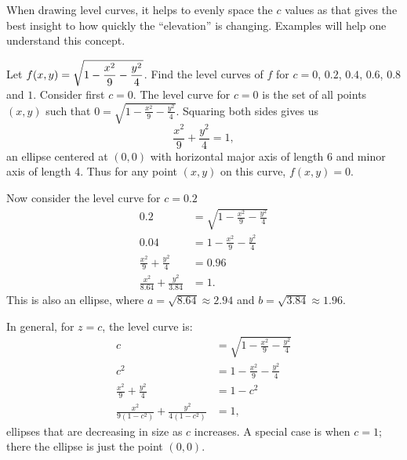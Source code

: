 When drawing level curves, it helps to evenly space the $c$ values as that gives the best insight to how quickly the ``elevation'' is changing. Examples will help one understand this concept.

\begin{example}\label{ex_levelcurve1}%
Let $\displaystyle f(x,y) = \sqrt{1-\frac{x^2}9-\frac{y^2}4}$. Find the level curves of $f$ for $c=0$, $0.2$, $0.4$, $0.6$, $0.8$ and $1$.
\solution
Consider first $c=0$. The level curve for $c=0$ is the set of all points $(x,y)$ such that $0=\sqrt{1-\frac{x^2}9-\frac{y^2}4}$. Squaring both sides  gives us
\[\frac{x^2}9+\frac{y^2}4=1,\]
an ellipse centered at $(0,0)$ with horizontal major axis of length 6 and minor axis of length 4. Thus for any point $(x,y)$ on this curve, $f(x,y) = 0$.

Now consider the level curve for $c=0.2$
\begin{align*}
0.2 &= \sqrt{1-\frac{x^2}9-\frac{y^2}4}\\
0.04 &= 1-\frac{x^2}9-\frac{y^2}4\\
\frac{x^2}9+\frac{y^2}4 &=0.96\\
\frac{x^2}{8.64}+\frac{y^2}{3.84} &=1.
\end{align*}
This is also an ellipse, where $a = \sqrt{8.64}\approx 2.94$ and $b=\sqrt{3.84}\approx 1.96$.

In general, for $z=c$, the level curve is:
\begin{align*}
c &= \sqrt{1-\frac{x^2}9-\frac{y^2}4}\\
c^2 &= 1-\frac{x^2}9-\frac{y^2}4\\
\frac{x^2}9+\frac{y^2}4 &=1-c^2\\
\frac{x^2}{9(1-c^2)}+\frac{y^2}{4(1-c^2)} &=1,
\end{align*}
ellipses that are decreasing in size as $c$ increases. A special case is when $c=1$; there the ellipse is just the point $(0,0)$. 


\end{example}
